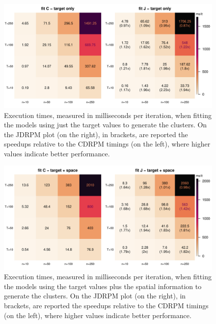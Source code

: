 \documentclass[12pt,	%
	a4paper,		%
	twoside,		%
	openright,		%
	titlepage,%
	]{book}
\theoremstyle{definition}
\begin{document}
\begin{figure}[!ht]
    \centering
    \includegraphics[width=1\linewidth]{Testing/Scaling possibilities/target.pdf}
    \caption[Execution times of JDRPM and CDRPM fits, target values only]{Execution times, measured in milliseconds per iteration, when fitting the models using just the target values to generate the clusters. On the JDRPM plot (on the right), in brackets, are reported the speedups relative to the CDRPM timings (on the left), where higher values indicate better performance.}
    \label{fig: scaling target}
\end{figure}

\begin{figure}[!ht]
    \centering
    \includegraphics[width=1\linewidth]{Testing/Scaling possibilities/target_space.pdf}
    \caption[Execution times of JDRPM and CDRPM fits, target plus space values]{Execution times, measured in milliseconds per iteration, when fitting the models using the target values plus the spatial information to generate the clusters. On the JDRPM plot (on the right), in brackets, are reported the speedups relative to the CDRPM timings (on the left), where higher values indicate better performance.}
    \label{fig: scaling target space}
\end{figure}
\end{document}
